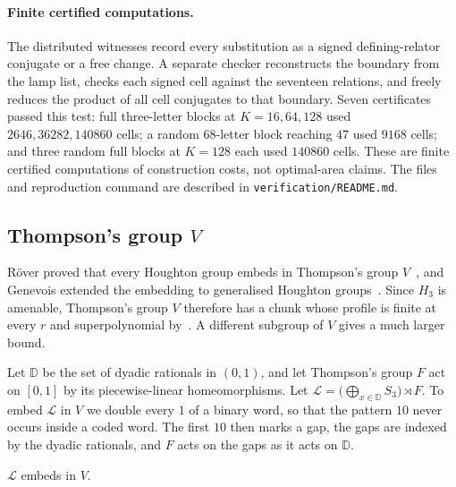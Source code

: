 \paragraph{Finite certified computations.}
The distributed witnesses record every substitution as a signed defining-relator conjugate or a free change.
A separate checker reconstructs the boundary from the lamp list, checks each signed cell against the seventeen relations, and freely
reduces the product of all cell conjugates to that boundary. Seven certificates passed this test: full three-letter blocks at
$K=16,64,128$ used $2646,36282,140860$ cells; a random $68$-letter block reaching $47$ used $9168$ cells; and three random full
blocks at $K=128$ each used $140860$ cells. These are finite certified computations of construction costs, not optimal-area claims.
The files and reproduction command are described in \texttt{verification/README.md}.

\subsection{Thompson's group \texorpdfstring{$V$}{V}}\label{sec:thompson}

R\"over proved that every Houghton group embeds in Thompson's group $V$~\cite[Proposition~2.6]{Rover1999}, and Genevois extended the
embedding to generalised Houghton groups~\cite[Corollary~5.11]{Genevois2019}. Since $H_3$ is amenable, Thompson's group $V$ therefore has a
chunk whose profile is finite at every $r$ and superpolynomial by~\cite[Theorem~1.1]{DouglasMghirbiA}. A different subgroup of $V$ gives a much
larger bound.

Let $\mathbb D$ be the set of dyadic rationals in $(0,1)$, and let Thompson's group $F$ act on $[0,1]$ by its piecewise-linear
homeomorphisms. Let $\mathcal L=\bigl(\bigoplus_{x\in\mathbb D}S_3\bigr)\rtimes F$. To embed $\mathcal L$ in $V$ we double every $1$ of a binary
word, so that the pattern $10$ never occurs inside a coded word. The first $10$ then marks a gap, the gaps are indexed by the dyadic rationals,
and $F$ acts on the gaps as it acts on $\mathbb D$.

\begin{lemma}\label{lem:gap-coding}
$\mathcal L$ embeds in $V$.
\end{lemma}

